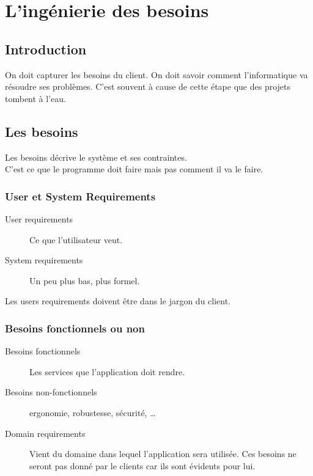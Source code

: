 \section{L'ingénierie des besoins}



\subsection{Introduction}
On doit capturer les besoins du client. On doit savoir comment l’informatique va résoudre ses problèmes. C’est souvent à cause de cette étape que des projets tombent à l’eau.



\subsection{Les besoins}
Les besoins décrive le système et ses contraintes.
\\C’est ce que le programme doit faire mais pas comment il va le faire.



\subsubsection{User et System Requirements}
\begin{description}
	\item [User requirements] Ce que l’utilisateur veut.
	\item [System requirements] Un peu plus bas, plus formel.
\end{description}
Les users requirements doivent être dans le jargon du client.



\subsubsection{Besoins fonctionnels ou non}
\begin{description}
	\item [Besoins fonctionnels] Les services que l’application doit rendre.
	\item [Besoins non-fonctionnels] ergonomie, robustesse, sécurité, …
	\item [Domain requirements] Vient du domaine dans lequel l’application sera utilisée. Ces besoins ne seront pas donné par le clients car ils sont évidents pour lui.
\end{description}



